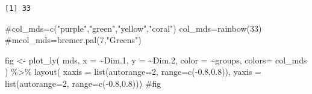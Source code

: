 \documentclass[
  letterpaper,
  DIV=11,
  numbers=noendperiod]{scrreprt}
\newenvironment{Shaded}{\begin{snugshade}}{\end{snugshade}}
\newcommand{\AttributeTok}[1]{\textcolor[rgb]{0.40,0.45,0.13}{#1}}
\newcommand{\CommentTok}[1]{\textcolor[rgb]{0.37,0.37,0.37}{#1}}
\newcommand{\DecValTok}[1]{\textcolor[rgb]{0.68,0.00,0.00}{#1}}
\newcommand{\FloatTok}[1]{\textcolor[rgb]{0.68,0.00,0.00}{#1}}
\newcommand{\FunctionTok}[1]{\textcolor[rgb]{0.28,0.35,0.67}{#1}}
\newcommand{\NormalTok}[1]{\textcolor[rgb]{0.00,0.23,0.31}{#1}}
\newcommand{\OtherTok}[1]{\textcolor[rgb]{0.00,0.23,0.31}{#1}}
\newcommand{\SpecialCharTok}[1]{\textcolor[rgb]{0.37,0.37,0.37}{#1}}
\begin{document}
\begin{Shaded}
\end{Shaded}

\begin{verbatim}
[1] 33
\end{verbatim}

\begin{Shaded}
\begin{Highlighting}[]
\CommentTok{\#col\_mds=c("purple","green","yellow","coral")}
\NormalTok{col\_mds}\OtherTok{=}\FunctionTok{rainbow}\NormalTok{(}\DecValTok{33}\NormalTok{)}
\CommentTok{\#mcol\_mds=bremer.pal(7,"Greens")}

\NormalTok{fig }\OtherTok{\textless{}{-}} 
\FunctionTok{plot\_ly}\NormalTok{(}
\NormalTok{  mds, }\AttributeTok{x =} \SpecialCharTok{\textasciitilde{}}\NormalTok{Dim}\FloatTok{.1}\NormalTok{, }\AttributeTok{y =} \SpecialCharTok{\textasciitilde{}}\NormalTok{Dim}\FloatTok{.2}\NormalTok{,}
  \AttributeTok{color =} \SpecialCharTok{\textasciitilde{}}\NormalTok{groups, }
  \AttributeTok{colors=}\NormalTok{ col\_mds}
\NormalTok{) }\SpecialCharTok{\%\textgreater{}\%}
  \FunctionTok{layout}\NormalTok{(}
    \AttributeTok{xaxis =} \FunctionTok{list}\NormalTok{(}\AttributeTok{autorange=}\DecValTok{2}\NormalTok{,}
      \AttributeTok{range=}\FunctionTok{c}\NormalTok{(}\SpecialCharTok{{-}}\FloatTok{0.8}\NormalTok{,}\FloatTok{0.8}\NormalTok{)), }\AttributeTok{yaxis =} \FunctionTok{list}\NormalTok{(}\AttributeTok{autorange=}\DecValTok{2}\NormalTok{,}
      \AttributeTok{range=}\FunctionTok{c}\NormalTok{(}\SpecialCharTok{{-}}\FloatTok{0.8}\NormalTok{,}\FloatTok{0.8}\NormalTok{)))}
\CommentTok{\#fig}
\end{Highlighting}
\end{Shaded}
\end{document}
